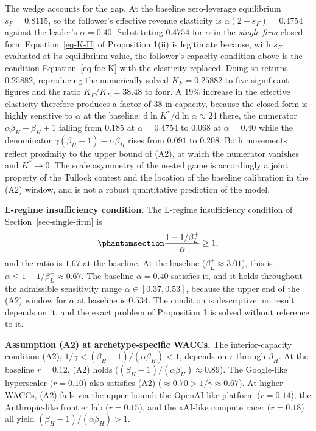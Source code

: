 \documentclass[
  11pt,
  letterpaper,
]{scrartcl}
\begin{document}
The wedge accounts for the gap. At the baseline zero-leverage
equilibrium \(s_F = 0.8115\), so the follower's effective revenue
elasticity is \(\alpha(2 - s_F) = 0.4754\) against the leader's
\(\alpha = 0.40\). Substituting \(0.4754\) for \(\alpha\) in the
\emph{single-firm} closed form Equation~\ref{eq-K-H} of Proposition
1(ii) is legitimate because, with \(s_F\) evaluated at its equilibrium
value, the follower's capacity condition above is the condition
Equation~\ref{eq-foc-K} with the elasticity replaced. Doing so returns
\(0.25882\), reproducing the numerically solved \(K_F = 0.25882\) to
five significant figures and the ratio \(K_F/K_L = 38.48\) to four. A
\(19\%\) increase in the effective elasticity therefore produces a
factor of \(38\) in capacity, because the closed form is highly
sensitive to \(\alpha\) at the baseline:
\(\mathrm{d}\ln K^*/\mathrm{d}\ln\alpha \approx 24\) there, the
numerator \(\alpha\beta_H - \beta_H + 1\) falling from \(0.185\) at
\(\alpha = 0.4754\) to \(0.068\) at \(\alpha = 0.40\) while the
denominator \(\gamma(\beta_H - 1) - \alpha\beta_H\) rises from \(0.091\)
to \(0.208\). Both movements reflect proximity to the upper bound of
(A2), at which the numerator vanishes and \(K^* \to 0\). The scale
asymmetry of the nested game is accordingly a joint property of the
Tullock contest and the location of the baseline calibration in the (A2)
window, and is not a robust quantitative prediction of the model.

\textbf{L-regime insufficiency condition.} The L-regime insufficiency
condition of Section~\ref{sec-single-firm} is
\begin{equation}\protect\phantomsection\label{eq-l-insufficiency}{
\frac{1 - 1/\beta_L^+}{\alpha} \geq 1,
}\end{equation} and the ratio is \(1.67\) at the baseline. At the
baseline (\(\beta_L^+ \approx 3.01\)), this is
\(\alpha \leq 1 - 1/\beta_L^+ \approx 0.67\). The baseline
\(\alpha = 0.40\) satisfies it, and it holds throughout the admissible
sensitivity range \(\alpha \in [0.37, 0.53]\), because the upper end of
the (A2) window for \(\alpha\) at baseline is \(0.534\). The condition
is descriptive: no result depends on it, and the exact problem of
Proposition 1 is solved without reference to it.

\textbf{Assumption (A2) at archetype-specific WACCs.} The
interior-capacity condition (A2),
\(1/\gamma < (\beta_H - 1)/(\alpha\beta_H) < 1\), depends on \(r\)
through \(\beta_H\). At the baseline \(r = 0.12\), (A2) holds
(\((\beta_H - 1)/(\alpha\beta_H) \approx 0.89\)). The Google-like
hyperscaler (\(r = 0.10\)) also satisfies (A2)
(\(\approx 0.70 > 1/\gamma \approx 0.67\)). At higher WACCs, (A2) fails
via the upper bound: the OpenAI-like platform (\(r = 0.14\)), the
Anthropic-like frontier lab (\(r = 0.15\)), and the xAI-like compute
racer (\(r = 0.18\)) all yield \((\beta_H - 1)/(\alpha\beta_H) > 1\).
\end{document}
